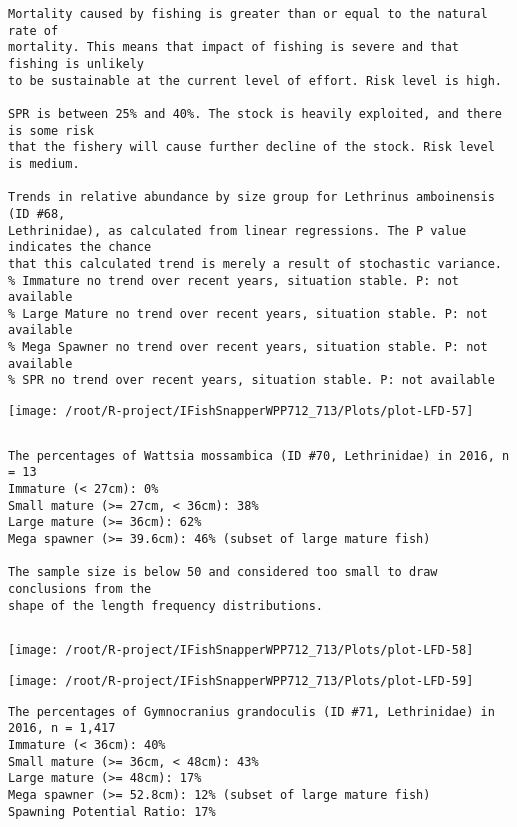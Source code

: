 \documentclass{report}\usepackage[]{graphicx}\usepackage[]{color}
\makeatletter
\def\maxwidth{ %
  \ifdim\Gin@nat@width>\linewidth
    \linewidth
  \else
    \Gin@nat@width
  \fi
}
\newenvironment{kframe}{%
 \def\at@end@of@kframe{}%
 \ifinner\ifhmode%
  \def\at@end@of@kframe{\end{minipage}}%
  \begin{minipage}{\columnwidth}%
 \fi\fi%
 \def\FrameCommand##1{\hskip\@totalleftmargin \hskip-\fboxsep
 \colorbox{shadecolor}{##1}\hskip-\fboxsep
     \hskip-\linewidth \hskip-\@totalleftmargin \hskip\columnwidth}%
 \MakeFramed {\advance\hsize-\width
   \@totalleftmargin\z@ \linewidth\hsize
   \@setminipage}}%
 {\par\unskip\endMakeFramed%
 \at@end@of@kframe}
\newenvironment{knitrout}{}{} %
\makeatother
\begin{document}
\begin{knitrout}
\begin{kframe}
\begin{verbatim}
Mortality caused by fishing is greater than or equal to the natural rate of
mortality. This means that impact of fishing is severe and that fishing is unlikely
to be sustainable at the current level of effort. Risk level is high.
 
SPR is between 25% and 40%. The stock is heavily exploited, and there is some risk
that the fishery will cause further decline of the stock. Risk level is medium.
 
Trends in relative abundance by size group for Lethrinus amboinensis (ID #68,
Lethrinidae), as calculated from linear regressions. The P value indicates the chance
that this calculated trend is merely a result of stochastic variance.
% Immature no trend over recent years, situation stable. P: not available
% Large Mature no trend over recent years, situation stable. P: not available
% Mega Spawner no trend over recent years, situation stable. P: not available
% SPR no trend over recent years, situation stable. P: not available
\end{verbatim}
\end{kframe}
\texttt{[image: /root/R-project/IFishSnapperWPP712\_713/Plots/plot-LFD-57]} 
\begin{kframe}\begin{verbatim}
\end{verbatim}
\end{kframe}
\clearpage
\newpage
\begin{kframe}\begin{verbatim}
The percentages of Wattsia mossambica (ID #70, Lethrinidae) in 2016, n = 13
Immature (< 27cm): 0%
Small mature (>= 27cm, < 36cm): 38%
Large mature (>= 36cm): 62%
Mega spawner (>= 39.6cm): 46% (subset of large mature fish)
 
The sample size is below 50 and considered too small to draw conclusions from the
shape of the length frequency distributions.
\end{verbatim}
\end{kframe}
\newpage
\begin{kframe}\begin{verbatim}
\end{verbatim}
\end{kframe}
\texttt{[image: /root/R-project/IFishSnapperWPP712\_713/Plots/plot-LFD-58]} 

\texttt{[image: /root/R-project/IFishSnapperWPP712\_713/Plots/plot-LFD-59]} 
\begin{kframe}\begin{verbatim}
The percentages of Gymnocranius grandoculis (ID #71, Lethrinidae) in 2016, n = 1,417
Immature (< 36cm): 40%
Small mature (>= 36cm, < 48cm): 43%
Large mature (>= 48cm): 17%
Mega spawner (>= 52.8cm): 12% (subset of large mature fish)
Spawning Potential Ratio: 17%
 

\end{verbatim}
\end{kframe}
\end{knitrout}
\end{document}
